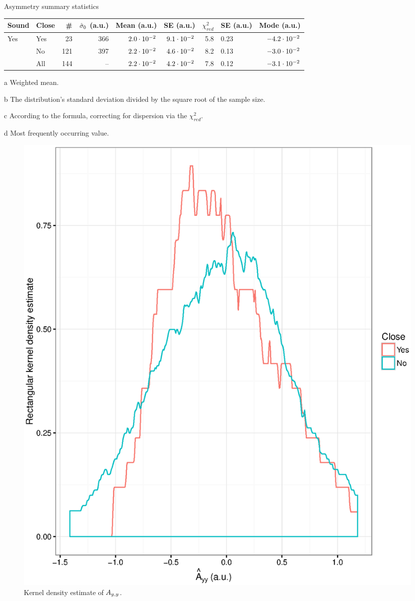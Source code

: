 \documentclass{report}
\begin{document}
\begin{threeparttable}[H]
	\centering
	\caption{Asymmetry summary statistics\label{tbl:AyySumStat}}
	\begin{tabular}{llrrrrrlr}
		\hline\hline
		Sound                & Close &  \# & $\CS*[0]$ (a.u.) & Mean\tnote{a} (a.u.) & SE\tnote{b} (a.u.) & $\chi^2_{red}$ & SE\tnote{c} (a.u.) & Mode\tnote{d} (a.u.) \\ \hline
		\multirow{3}{*}{Yes} & Yes   &  23 &              366 &       $2.0\cdot10^{-2}$ &     $9.1\cdot10^{-2}$ &            5.8 & 0.23               &      $-4.2\cdot10^{-2}$ \\
		                     & No    & 121 &              397 &       $2.2\cdot10^{-2}$ &     $4.6\cdot10^{-2}$ &            8.2 & 0.13               &      $-3.0\cdot10^{-2}$ \\
		                     & All   & 144 &               -- &       $2.2\cdot10^{-2}$ &     $4.2\cdot10^{-2}$ &            7.8 & 0.12               &      $-3.1\cdot10^{-2}$ \\ \hline
	\end{tabular}
	\begin{tablenotes}
		\item[a]{Weighted mean.}
		\item[b]{The distribution's standard deviation divided by the square root of the sample size.}
		\item[c]{According to the formula, correcting for dispersion via the $\chi^2_{red}$.}
		\item[d]{Most frequently occurring value.}
	\end{tablenotes}
\end{threeparttable}

\begin{figure}
	\centering
	\includegraphics{Ayy_dens.eps}
	\caption{Kernel density estimate of $\Ayy$.}
\end{figure}
\end{document}
